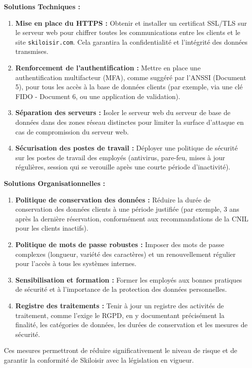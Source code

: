 \documentclass[12pt,a4paper]{article}
\begin{document}
\textbf{Solutions Techniques :} 
\begin{enumerate}
    	\item \textbf{Mise en place du HTTPS :} Obtenir et installer un certificat SSL/TLS sur le serveur web pour chiffrer toutes les communications entre les clients et le site \texttt{skiloisir.com}. Cela garantira la confidentialité et l'intégrité des données transmises.
    	\item \textbf{Renforcement de l'authentification :} Mettre en place une authentification multifacteur (MFA), comme suggéré par l'ANSSI (Document 5), pour tous les accès à la base de données clients (par exemple, via une clé FIDO - Document 6, ou une application de validation).
    	\item \textbf{Séparation des serveurs :} Isoler le serveur web du serveur de base de données dans des zones réseau distinctes pour limiter la surface d'attaque en cas de compromission du serveur web.
    	\item \textbf{Sécurisation des postes de travail :} Déployer une politique de sécurité sur les postes de travail des employés (antivirus, pare-feu, mises à jour régulières, session qui se verouille après une courte période d'inactivité).
\end{enumerate}

\textbf{Solutions Organisationnelles :} 
\begin{enumerate}
    	\item \textbf{Politique de conservation des données :} Réduire la durée de conservation des données clients à une période justifiée (par exemple, 3 ans après la dernière réservation, conformément aux recommandations de la CNIL pour les clients inactifs).
    	\item \textbf{Politique de mots de passe robustes :} Imposer des mots de passe complexes (longueur, variété des caractères) et un renouvellement régulier pour l'accès à tous les systèmes internes.
    	\item \textbf{Sensibilisation et formation :} Former les employés aux bonnes pratiques de sécurité et à l'importance de la protection des données personnelles.
    	\item \textbf{Registre des traitements :} Tenir à jour un registre des activités de traitement, comme l'exige le RGPD, en y documentant précisément la finalité, les catégories de données, les durées de conservation et les mesures de sécurité.
\end{enumerate}

Ces mesures permettront de réduire significativement le niveau de risque et de garantir la conformité de Skiloisir avec la législation en vigueur.
\end{document}

